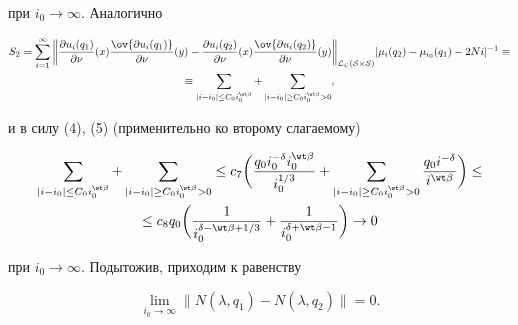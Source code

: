 при $i_0\to\infty$. Аналогично 


\begin{gather*} 


S_2=\sum^\infty_{i=1}\bigg\| 


\frac{\partial u_i(q_1)}{\partial\nu}(x) 


\frac{\ov{\partial u_i(q_1)}}{\partial\nu}(y)- 


\frac{\partial u_i(q_2)}{\partial\nu}(x) 


\frac{\ov{\partial u_i(q_2)}}{\partial\nu}(y) 


\bigg\|_{\cal L_2(S\times S)} 


|\mu_i(q_2)-\mu_{i_0}(q_1)-2N i|^{-1}\equiv \\ 


% 


\equiv 


\sum_{|i-i_0|\le C_0 i^{\wt \beta}_0}+ 


\sum_{|i-i_0|\ge C_0 i^{\wt \beta}_0>0}, 


\end{gather*} 


и в силу (4), (5) (применительно ко второму слагаемому) 


\begin{gather*} 


\sum_{|i-i_0|\le C_0 i^{\wt \beta}_0}+ 


\sum_{|i-i_0|\ge C_0 i^{\wt \beta}_0>0}\le c_7\bigg( 


\frac{q_0i_0^{-\delta}i_0^{\wt\beta}}{i_0^{1/3}}+ 


\sum_{|i-i_0|\ge C_0 i^{\wt \beta}_0>0} 


\frac{q_0i^{-\delta}}{i^{\wt\beta}}\bigg)\le \\ 


% 


\le c_8 q_0\bigg(\frac{1}{i_0^{\delta-\wt\beta+1/3}}+ 


\frac{1}{i_0^{\delta+\wt\beta-1}}\bigg)\to 0 


\end{gather*} 


при $i_0\to\infty$. Подытожив, приходим к равенству 


\begin{equation} 


\lim_{i_0\to\infty}\|N(\lambda,q_1)-N(\lambda,q_2)\|=0. 


\end{equation} 


 


